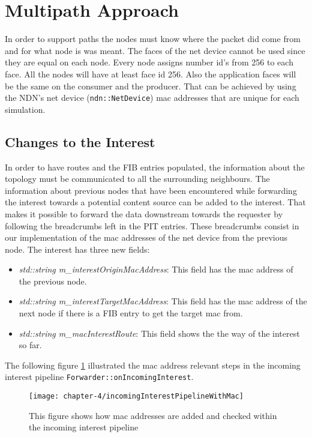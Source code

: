 \section{Multipath Approach}

In order to support paths the nodes must know where the packet did come from and for what node is was meant. The faces of the net device cannot be used since they are equal on each node. Every node assigns number id's from 256 to each face. All the nodes will have at least face id 256. Also the application faces will be the same on the consumer and the producer. That can be achieved by using the NDN's net device (\texttt{ndn::NetDevice}) mac addresses that are unique for each simulation. 

\subsection{Changes to the Interest}

In order to have routes and the FIB entries populated, the information about the topology must be communicated to all the surrounding neighbours. The information about previous nodes that have been encountered while forwarding the interest towards a potential content source can be added to the interest. That makes it possible to forward the data downstream towards the requester by following the breadcrumbs left in the PIT entries. These breadcrumbs consist in our implementation of the mac addresses of the net device from the previous node. The interest has three new fields:

\begin{itemize}
\item \emph{std::string m\_interestOriginMacAddress}: This field has the mac address of the previous node.
\item \emph{std::string m\_interestTargetMacAddress}: This field has the mac address of the next node if there is a FIB entry to get the target mac from.
\item \emph{std::string m\_macInterestRoute}: This field shows the the way of the interest so far.
\end{itemize}

The following figure \ref{fig:incomingInterestPipelineWithMac} illustrated the mac address relevant steps in the incoming interest pipeline \texttt{Forwarder::onIncomingInterest}.

\begin{figure}[H]
  \centering
  \texttt{[image: chapter-4/incomingInterestPipelineWithMac]}
  \caption{This figure shows how mac addresses are added and checked within the incoming interest pipeline}
  \label{fig:incomingInterestPipelineWithMac}
\end{figure}

